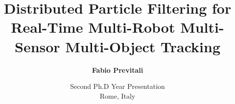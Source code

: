 \documentclass{beamer}
\title[Distributed Particle Filtering for Real-Time Multi-Robot Multi-Sensor MOT]{\Large Distributed Particle Filtering for Real-Time Multi-Robot Multi- Sensor Multi-Object Tracking}
\subtitle{}
\author[Fabio Previtali]{\Large\textbf{Fabio Previtali}}
\date[October 29, 2014]{Second Ph.D Year Presentation\\Rome, Italy}
\begin{document}
\begin{frame}[plain]
	\titlepage
\end{frame}








\tiny
\nocite{Kasturi09}
\nocite{Berclaz11}
\nocite{Kitani12}
\nocite{Yang09}
\nocite{Andriyenko11}
\nocite{Leal11}
\nocite{Sharma09}
\nocite{Ng00}


\end{document}
